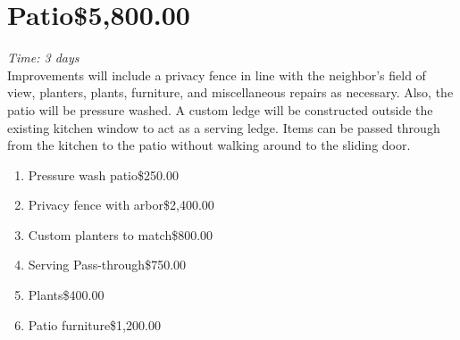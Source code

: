 \documentclass[letterpaper,10pt]{article}
\begin{document}
\section{Patio\dotfill\$5,800.00}
\emph{Time: 3 days} \\
Improvements will include a privacy fence in line with the neighbor's field of view, planters, plants, furniture, and miscellaneous repairs as necessary.  Also, the patio will be pressure washed.  A custom ledge will be constructed outside the existing kitchen window to act as a serving ledge.  Items can be passed through from the kitchen to the patio without walking around to the sliding door.
\begin{enumerate}
	\item Pressure wash patio\dotfill\$250.00
	\item Privacy fence with arbor\dotfill\$2,400.00
	\item Custom planters to match\dotfill\$800.00
	\item Serving Pass-through\dotfill\$750.00
	\item Plants\dotfill\$400.00
	\item Patio furniture\dotfill\$1,200.00
\end{enumerate}
\end{document}
